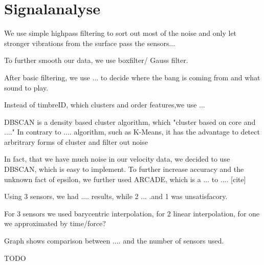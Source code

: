 \section*{Signalanalyse}

We use simple highpass filtering to sort out most of the noise and only let stronger vibrations from the surface pass the sensors... 

To further smooth our data, we use boxfilter/ Gauss filter.

After basic filtering, we use ... to decide where the bang is coming from and what sound to play.

Instead of timbreID, which clusters and order features,we use ... \cite{timbreID}

DBSCAN is a density based cluster algorithm, which "cluster based on core and ...."
In contrary to .... algorithm, such as K-Means, it has the advantage to detect arbritrary forms of cluster and filter out noise\cite{Elbatta2013ADM}

In fact, that we have much noise in our velocity data, we decided to use DBSCAN, which is easy to implement. 
To further increase accuracy and the unknown fact of epsilon, we further used ARCADE, which is a ... to .... [cite]

Using 3 sensors, we had .... results, while 2 ... .and 1 was unsatisfacory.

For 3 sensors we used barycentric interpolation, for 2 linear interpolation, for one we approximated by time/force? 


Graph shows comparison between .... and the number of sensors used.

TODO